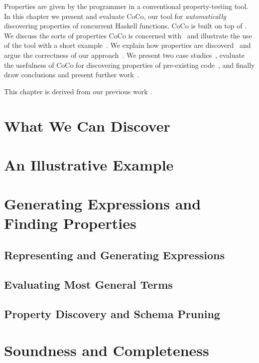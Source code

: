 \chapstart Properties are given by the programmer in a conventional
property-testing tool.  In this chapter we present and evaluate CoCo, our tool
for \emph{automatically} discovering properties of concurrent Haskell functions.
CoCo is built on top of \dejafu{}.  We discuss the sorts of properties CoCo is
concerned with~ and illustrate the use of the tool with a short
example~.  We explain how properties are
discoverd~ and argue the correctness of our
approach~.  We present two case
studies~, evaluate the usefulness of CoCo for discovering
properties of pre-existing code~, and finally draw
conclusions and present further work~.

This chapter is derived from our previous work .

\section{What We Can Discover}
\label{sec:coco-scope}

\blindtext

\section{An Illustrative Example}
\label{sec:coco-example}

\blindtext

\section{Generating Expressions and Finding Properties}
\label{sec:coco-hiw}

\blindtext

\subsection{Representing and Generating Expressions}
\subsection{Evaluating Most General Terms}
\subsection{Property Discovery and Schema Pruning}

\section{Soundness and Completeness}
\label{sec:coco-correctness}


